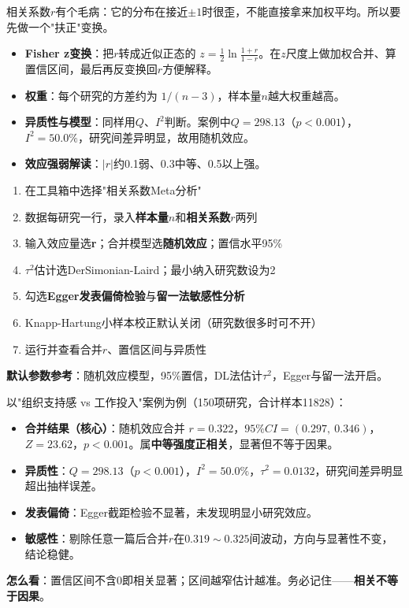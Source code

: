 \begin{algoprinciple}
相关系数$r$有个毛病：它的分布在接近$\pm1$时很歪，不能直接拿来加权平均。所以要先做一个"扶正"变换。

\begin{itemize}
    \item \textbf{Fisher z变换}：把$r$转成近似正态的 $z = \frac{1}{2}\ln\frac{1+r}{1-r}$。在$z$尺度上做加权合并、算置信区间，最后再反变换回$r$方便解释。
    \item \textbf{权重}：每个研究的方差约为 $1/(n-3)$，样本量$n$越大权重越高。
    \item \textbf{异质性与模型}：同样用$Q$、$I^2$判断。案例中$Q=298.13$（$p<0.001$），$I^2=50.0\%$，研究间差异明显，故用随机效应。
    \item \textbf{效应强弱解读}：$|r|$约0.1弱、0.3中等、0.5以上强。
\end{itemize}
\end{algoprinciple}

\begin{algosposs}
\begin{enumerate}
    \item 在工具箱中选择"相关系数Meta分析"
    \item 数据每研究一行，录入\textbf{样本量$n$}和\textbf{相关系数$r$}两列
    \item 输入效应量选\textbf{r}；合并模型选\textbf{随机效应}；置信水平95\%
    \item $\tau^2$估计选DerSimonian-Laird；最小纳入研究数设为2
    \item 勾选\textbf{Egger发表偏倚检验}与\textbf{留一法敏感性分析}
    \item Knapp-Hartung小样本校正默认关闭（研究数很多时可不开）
    \item 运行并查看合并$r$、置信区间与异质性
\end{enumerate}

\textbf{默认参数参考}：随机效应模型，95\%置信，DL法估计$\tau^2$，Egger与留一法开启。
\end{algosposs}

\begin{algoresult}
以"组织支持感 vs 工作投入"案例为例（150项研究，合计样本11828）：

\begin{itemize}
    \item \textbf{合并结果（核心）}：随机效应合并 $r=0.322$，$95\%CI=(0.297,\ 0.346)$，$Z=23.62$，$p<0.001$。属\textbf{中等强度正相关}，显著但不等于因果。
    \item \textbf{异质性}：$Q=298.13$（$p<0.001$），$I^2=50.0\%$，$\tau^2=0.0132$，研究间差异明显超出抽样误差。
    \item \textbf{发表偏倚}：Egger截距检验不显著，未发现明显小研究效应。
    \item \textbf{敏感性}：剔除任意一篇后合并$r$在$0.319\sim0.325$间波动，方向与显著性不变，结论稳健。
\end{itemize}

\textbf{怎么看}：置信区间不含0即相关显著；区间越窄估计越准。务必记住——\textbf{相关不等于因果}。
\end{algoresult}

